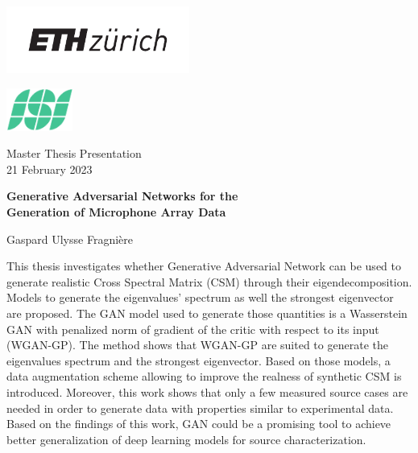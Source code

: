 \documentclass[12pt,pdftex,16x10]{elpres} %
\begin{document}
\begin{titlepage}
  \centering
  \parbox{0.6\textwidth}{\includegraphics[height=2.2cm]{resources/ethlogo_short}}
  \hfill
  \parbox{0.35\textwidth}{ 
    \mbox{}\hfill \includegraphics[height=1.4cm]{resources/isilogo_plain}}
  
  Master Thesis Presentation\\
  21 February 2023
  
  \LARGE
  \textbf{Generative Adversarial Networks for the\\
  Generation of Microphone Array Data}
  

  \normalsize
  Gaspard Ulysse Fragnière

\end{titlepage}

\begin{psli}[Abstract]
  This thesis investigates whether Generative Adversarial Network can be used to generate realistic Cross Spectral Matrix (CSM) through their eigendecomposition. Models to generate the eigenvalues' spectrum as well the strongest eigenvector are proposed. The GAN model used to generate those quantities is a Wasserstein GAN with penalized norm of gradient of the critic with respect to its input (WGAN-GP). The method shows that WGAN-GP are suited to generate the eigenvalues spectrum and the strongest eigenvector. Based on those models, a data augmentation scheme allowing to improve the realness of synthetic CSM is introduced. Moreover, this work shows that only a few measured source cases are needed in order to generate data with properties similar to experimental data. Based on the findings of this work, GAN  could be a promising tool to achieve better generalization of deep learning models for source characterization.
\end{psli}
\end{document}
